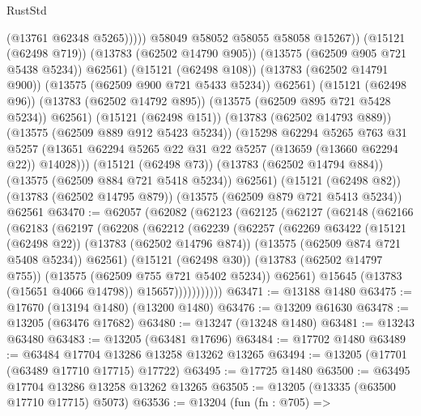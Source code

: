 \begin{lexlean}{RustStd}
\begin{coremodule}
                          (@13761 @62348 @5265)))))
                  @58049
                  @58052
                  @58055
                  @58058
                  @15267))
              (@15121 (@62498 @719))
              (@13783 (@62502 @14790 @905))
              (@13575 (@62509 @905 @721 @5438 @5234))
              @62561)
            (@15121 (@62498 @108))
            (@13783 (@62502 @14791 @900))
            (@13575 (@62509 @900 @721 @5433 @5234))
            @62561)
          (@15121 (@62498 @96))
          (@13783 (@62502 @14792 @895))
          (@13575 (@62509 @895 @721 @5428 @5234))
          @62561)
        (@15121 (@62498 @151))
        (@13783 (@62502 @14793 @889))
        (@13575 (@62509 @889 @912 @5423 @5234))
        (@15298
          @62294
          @5265
          @763
          @31
          @5257
          (@13651 @62294 @5265 @22 @31 @22 @5257 (@13659 (@13660 @62294 @22)) @14028)))
      (@15121 (@62498 @73))
      (@13783 (@62502 @14794 @884))
      (@13575 (@62509 @884 @721 @5418 @5234))
      @62561)
    (@15121 (@62498 @82))
    (@13783 (@62502 @14795 @879))
    (@13575 (@62509 @879 @721 @5413 @5234))
    @62561
@63470 := @62057
    (@62082
      (@62123
        (@62125
          (@62127
            (@62148
              (@62166
                (@62183
                  (@62197
                    (@62208
                      (@62212
                        (@62239
                          (@62257
                            (@62269
                              @63422
                              (@15121 (@62498 @22))
                              (@13783 (@62502 @14796 @874))
                              (@13575 (@62509 @874 @721 @5408 @5234))
                              @62561)
                            (@15121 (@62498 @30))
                            (@13783 (@62502 @14797 @755))
                            (@13575 (@62509 @755 @721 @5402 @5234))
                            @62561)
                          @15645
                          (@13783 (@15651 @4066 @14798))
                          @15657)))))))))))
@63471 := @13188 @1480
@63475 := @17670 (@13194 @1480) (@13200 @1480)
@63476 := @13209 @61630
@63478 := @13205 (@63476 @17682)
@63480 := @13247 (@13248 @1480)
@63481 := @13243 @63480
@63483 := @13205 (@63481 @17696)
@63484 := @17702 @1480
@63489 := @63484 @17704 @13286 @13258 @13262 @13265
@63494 := @13205 (@17701 (@63489 @17710 @17715) @17722)
@63495 := @17725 @1480
@63500 := @63495 @17704 @13286 @13258 @13262 @13265
@63505 := @13205 (@13335 (@63500 @17710 @17715) @5073)
@63536 := @13204
    (fun (fn : @705) =>

\end{coremodule}
\end{lexlean}
